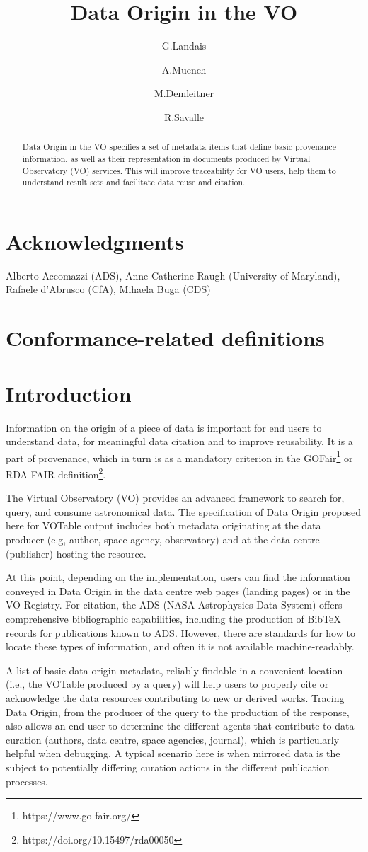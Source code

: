 \documentclass[11pt,a4paper]{ivoa}
\title{Data Origin in the VO}
\author{G.Landais}
\author{A.Muench}
\author{M.Demleitner}
\author{R.Savalle}
\begin{document}
\begin{abstract}
Data Origin in the VO specifies a set of metadata items that define basic
provenance information, as well as their representation in documents produced
by Virtual Observatory (VO) services.  This will improve traceability for VO
users, help them to understand result sets and facilitate data reuse and citation.

\end{abstract}


\section*{Acknowledgments}
Alberto Accomazzi (ADS), Anne Catherine Raugh (University of Maryland), Rafaele d'Abrusco (CfA), Mihaela Buga (CDS)

\section*{Conformance-related definitions}


\section{Introduction}

Information on the origin of a piece of data is important for end users to understand data, for meaningful data citation and to improve reusability.  It is a part of provenance, which in turn is as a mandatory criterion in the GOFair\footnote{https://www.go-fair.org/} or RDA FAIR definition\footnote{https://doi.org/10.15497/rda00050}.

The Virtual Observatory (VO) provides an advanced framework to search for, query, and consume astronomical data.  The specification of Data Origin proposed here for VOTable output includes both metadata originating at the data producer (e.g, author, space agency, observatory) and at the data centre (publisher) hosting the resource.

At this point, depending on the implementation, users can find the information conveyed in Data Origin in the data centre web pages (landing pages) or in the VO Registry.  For citation, the ADS (NASA Astrophysics Data System) offers comprehensive bibliographic capabilities, including the production of BibTeX records for publications known to ADS.  However, there are standards for how to locate these types of information, and often it is not available machine-readably.

A list of basic data origin metadata, reliably findable in a convenient location (i.e.,
the VOTable produced by a query) will help users to properly cite or
acknowledge the data resources contributing to new or derived works.
Tracing Data Origin, from the producer of the query to the production of the response, also allows an end user to determine the different agents that contribute to data curation (authors, data centre, space agencies, journal), which is particularly helpful when debugging.  A typical scenario here is when mirrored data is the subject to potentially differing curation actions in the different publication processes.
\end{document}
